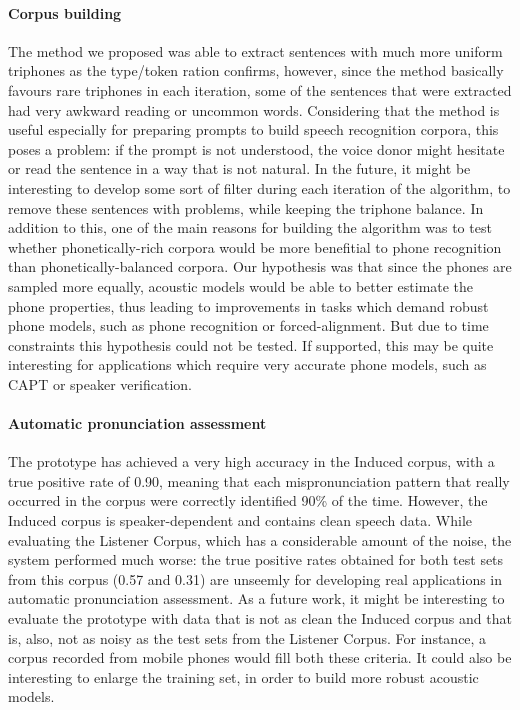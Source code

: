 \paragraph*{Corpus building}
The method we proposed was able to extract sentences with much more uniform triphones as the type/token ration confirms, however, since the method basically favours rare triphones in each iteration, some of the sentences that were extracted had very awkward reading or uncommon words. Considering that the method is useful especially for preparing prompts to build speech recognition corpora, this poses a problem: if the prompt is not understood, the voice donor might hesitate or read the sentence in a way that is not natural. In the future, it might be interesting to develop some sort of filter during each iteration of the algorithm, to remove these sentences with problems, while keeping the triphone balance. In addition to this, one of the main reasons for building the algorithm was to test whether phonetically-rich corpora would be more benefitial to phone recognition than phonetically-balanced corpora. Our hypothesis was that  since the phones are sampled more equally, acoustic models would be able to better estimate the phone properties, thus leading to improvements in tasks which demand robust phone models, such as phone recognition or forced-alignment. But due to time constraints this hypothesis could not be tested. If supported, this may be quite interesting for applications which require very accurate phone models, such as \ac{CAPT} or speaker verification.

\paragraph*{Automatic pronunciation assessment}
The prototype has achieved a very high accuracy in the Induced corpus, with a true positive rate of 0.90, meaning that each mispronunciation pattern that really occurred in the corpus were correctly identified 90\% of the time. However, the Induced corpus is speaker-dependent and contains clean speech data. While evaluating the Listener Corpus, which has a considerable amount of the noise, the system performed much worse: the true positive rates obtained for both test sets from this corpus (0.57 and 0.31) are unseemly for developing real applications in automatic pronunciation assessment. As a future work, it might be interesting to evaluate the prototype with data that is not as clean the Induced corpus and that is, also, not as noisy as the test sets from the Listener Corpus. For instance, a corpus recorded from mobile phones would fill both these criteria. It could also be interesting to enlarge the training set, in order to build more robust acoustic models.

